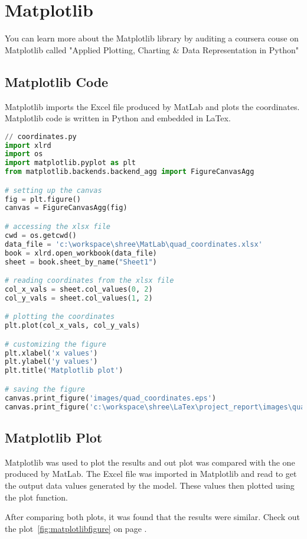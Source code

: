 \documentclass{article}
\begin{document}
\section{Matplotlib}
You can learn more about the Matplotlib library by auditing a coursera couse on Matplotlib called "Applied Plotting, Charting \& Data Representation in Python" \cite{matplotlibcoursera}

\subsection{Matplotlib Code}
Matplotlib imports the Excel file produced by MatLab and plots the coordinates. Matplotlib code is written in Python and embedded in LaTex\cite{matplotlibcode}. 

\begin{lstlisting}[language=Python, style=mystyle]
// coordinates.py
import xlrd
import os
import matplotlib.pyplot as plt
from matplotlib.backends.backend_agg import FigureCanvasAgg

# setting up the canvas
fig = plt.figure()
canvas = FigureCanvasAgg(fig)

# accessing the xlsx file
cwd = os.getcwd()
data_file = 'c:\workspace\shree\MatLab\quad_coordinates.xlsx'
book = xlrd.open_workbook(data_file)
sheet = book.sheet_by_name("Sheet1")

# reading coordinates from the xlsx file
col_x_vals = sheet.col_values(0, 2)
col_y_vals = sheet.col_values(1, 2)

# plotting the coordinates
plt.plot(col_x_vals, col_y_vals)

# customizing the figure
plt.xlabel('x values')
plt.ylabel('y values')
plt.title('Matplotlib plot')

# saving the figure
canvas.print_figure('images/quad_coordinates.eps')
canvas.print_figure('c:\workspace\shree\LaTex\project_report\images\quad_coordinates.eps')

\end{lstlisting}

\subsection{Matplotlib Plot}
Matplotlib was used to plot the results and out plot was compared with the one produced by MatLab. The Excel file was imported in Matplotlib and read to get the output data values generated by the model. These values then plotted using the plot function. 

After comparing both plots, it was found that the results were similar. Check out the plot~\ref{fig:matplotlibfigure} on page \pageref{fig:matplotlibfigure}.
\end{document}
